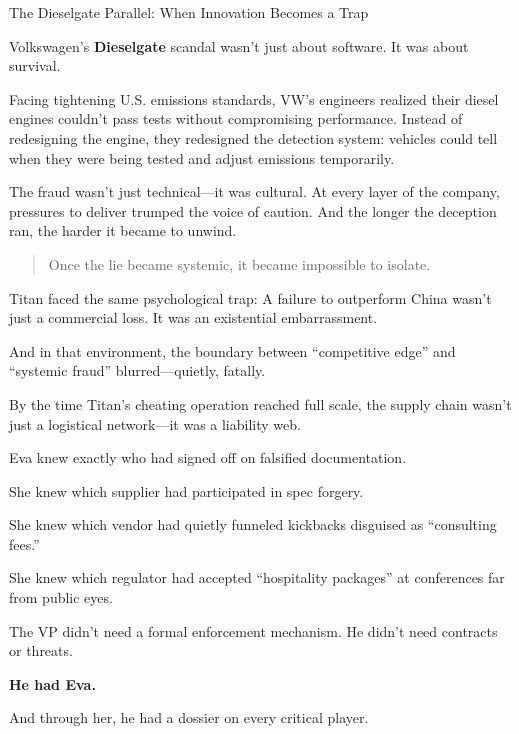 \begin{PsychologySidebar}{The Dieselgate Parallel: When Innovation Becomes a Trap}

Volkswagen’s \textbf{Dieselgate} scandal wasn’t just about software.
It was about survival.

\medskip

Facing tightening U.S. emissions standards, VW’s engineers realized their diesel engines couldn’t pass tests without compromising performance. Instead of redesigning the engine, they redesigned the detection system: vehicles could tell when they were being tested and adjust emissions temporarily.

\medskip

The fraud wasn’t just technical—it was cultural.
At every layer of the company, pressures to deliver trumped the voice of caution.
And the longer the deception ran, the harder it became to unwind.

\begin{quote}
Once the lie became systemic, it became impossible to isolate.
\end{quote}

Titan faced the same psychological trap:
A failure to outperform China wasn’t just a commercial loss.
It was an existential embarrassment.

\medskip

And in that environment, the boundary between “competitive edge” and “systemic fraud” blurred—quietly, fatally.

\end{PsychologySidebar}

\medskip

By the time Titan’s cheating operation reached full scale,
the supply chain wasn’t just a logistical network—it was a liability web.

Eva knew exactly who had signed off on falsified documentation.

She knew which supplier had participated in spec forgery.

She knew which vendor had quietly funneled kickbacks disguised as “consulting fees.”

She knew which regulator had accepted “hospitality packages” at conferences far from public eyes.

The VP didn’t need a formal enforcement mechanism.
He didn’t need contracts or threats.

\textbf{He had Eva.}

And through her,
he had a dossier on every critical player.


